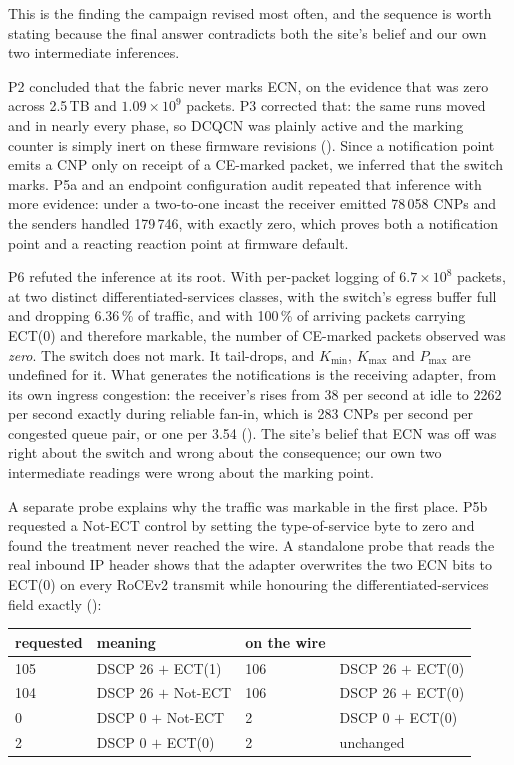 This is the finding the campaign revised most often, and the sequence is worth
stating because the final answer contradicts both the site's belief and our own
two intermediate inferences.

P2 concluded that the fabric never marks ECN, on the evidence that
 was zero across 2.5\,TB and $1.09 \times
10^{9}$ packets. P3 corrected that: the same runs moved  and
 in nearly every phase, so DCQCN was plainly active and
the marking counter is simply inert on these firmware revisions
(). Since a notification point emits a CNP only on receipt of a
CE-marked packet, we inferred that the switch marks. P5a and an endpoint
configuration audit repeated that inference with more evidence: under a
two-to-one incast the receiver emitted 78\,058 CNPs and the senders handled
179\,746, with  exactly zero, which proves both a
notification point and a reacting reaction point at firmware default.

P6 refuted the inference at its root. With per-packet logging of $6.7 \times
10^{8}$ packets, at two distinct differentiated-services classes, with the
switch's egress buffer full and dropping 6.36\,\% of traffic, and with 100\,\%
of arriving packets carrying ECT(0) and therefore markable, the number of
CE-marked packets observed was \emph{zero}. The switch does not mark. It
tail-drops, and $K_{\min}$, $K_{\max}$ and $P_{\max}$ are undefined for it.
What generates the notifications is the receiving adapter, from its own ingress
congestion: the receiver's  rises from 38 per second at
idle to 2262 per second exactly during reliable fan-in, which is 283 CNPs per
second per congested queue pair, or one per 3.54\mS{} (). The site's
belief that ECN was off was right about the switch and wrong about the
consequence; our own two intermediate readings were wrong about the marking
point.

A separate probe explains why the traffic was markable in the first place.
P5b requested a Not-ECT control by setting the type-of-service byte to zero and
found the treatment never reached the wire. A standalone probe that reads the
real inbound IP header shows that the adapter overwrites the two ECN bits to
ECT(0) on every RoCEv2 transmit while honouring the differentiated-services
field exactly ():

\begin{center}\small
\begin{tabular}{@{}llll@{}}
  \toprule
  requested & meaning & on the wire & \\
  \midrule
  105 & DSCP 26 $+$ ECT(1)   & 106 & DSCP 26 $+$ ECT(0) \\
  104 & DSCP 26 $+$ Not-ECT  & 106 & DSCP 26 $+$ ECT(0) \\
  0   & DSCP 0 $+$ Not-ECT   & 2   & DSCP 0 $+$ ECT(0) \\
  2   & DSCP 0 $+$ ECT(0)    & 2   & unchanged \\
  \bottomrule
\end{tabular}
\end{center}

